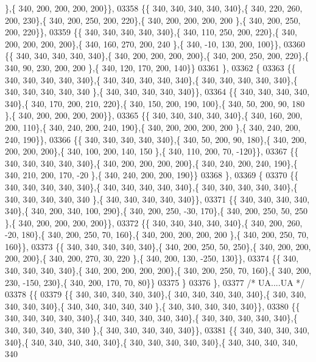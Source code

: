 \begin{DoxyCode}
      \},\{ 340, 200, 200, 200, 200\}\},
03358 \{\{ 340, 340, 340, 340, 340\},\{ 340, 220, 260, 200, 230\},\{ 340, 200, 250, 200, 220\},\{ 340, 200, 200, 200, 200
      \},\{ 340, 200, 250, 200, 220\}\},
03359 \{\{ 340, 340, 340, 340, 340\},\{ 340, 110, 250, 200, 220\},\{ 340, 200, 200, 200, 200\},\{ 340, 160, 270, 200, 240
      \},\{ 340, -10, 130, 200, 100\}\},
03360 \{\{ 340, 340, 340, 340, 340\},\{ 340, 200, 200, 200, 200\},\{ 340, 200, 250, 200, 220\},\{ 340,  90, 230, 200, 200
      \},\{ 340, 120, 170, 200, 140\}\}
03361 \},
03362 \{
03363 \{\{ 340, 340, 340, 340, 340\},\{ 340, 340, 340, 340, 340\},\{ 340, 340, 340, 340, 340\},\{ 340, 340, 340, 340, 340
      \},\{ 340, 340, 340, 340, 340\}\},
03364 \{\{ 340, 340, 340, 340, 340\},\{ 340, 170, 200, 210, 220\},\{ 340, 150, 200, 190, 100\},\{ 340,  50, 200,  90, 180
      \},\{ 340, 200, 200, 200, 200\}\},
03365 \{\{ 340, 340, 340, 340, 340\},\{ 340, 160, 200, 200, 110\},\{ 340, 240, 200, 240, 190\},\{ 340, 200, 200, 200, 200
      \},\{ 340, 240, 200, 240, 190\}\},
03366 \{\{ 340, 340, 340, 340, 340\},\{ 340,  50, 200,  90, 180\},\{ 340, 200, 200, 200, 200\},\{ 340, 100, 200, 140, 150
      \},\{ 340, 110, 200,  70, -120\}\},
03367 \{\{ 340, 340, 340, 340, 340\},\{ 340, 200, 200, 200, 200\},\{ 340, 240, 200, 240, 190\},\{ 340, 210, 200, 170, -20
      \},\{ 340, 240, 200, 200, 190\}\}
03368 \},
03369 \{
03370 \{\{ 340, 340, 340, 340, 340\},\{ 340, 340, 340, 340, 340\},\{ 340, 340, 340, 340, 340\},\{ 340, 340, 340, 340, 340
      \},\{ 340, 340, 340, 340, 340\}\},
03371 \{\{ 340, 340, 340, 340, 340\},\{ 340, 200, 340, 100, 290\},\{ 340, 200, 250, -30, 170\},\{ 340, 200, 250,  50, 250
      \},\{ 340, 200, 200, 200, 200\}\},
03372 \{\{ 340, 340, 340, 340, 340\},\{ 340, 200, 260, -20, 180\},\{ 340, 200, 250,  70, 160\},\{ 340, 200, 200, 200, 200
      \},\{ 340, 200, 250,  70, 160\}\},
03373 \{\{ 340, 340, 340, 340, 340\},\{ 340, 200, 250,  50, 250\},\{ 340, 200, 200, 200, 200\},\{ 340, 200, 270,  30, 220
      \},\{ 340, 200, 130, -250, 130\}\},
03374 \{\{ 340, 340, 340, 340, 340\},\{ 340, 200, 200, 200, 200\},\{ 340, 200, 250,  70, 160\},\{ 340, 200, 230, -150, 
      230\},\{ 340, 200, 170,  70,  80\}\}
03375 \}
03376 \},
03377 \textcolor{comment}{/* UA....UA */}
03378 \{\{
03379 \{\{ 340, 340, 340, 340, 340\},\{ 340, 340, 340, 340, 340\},\{ 340, 340, 340, 340, 340\},\{ 340, 340, 340, 340, 340
      \},\{ 340, 340, 340, 340, 340\}\},
03380 \{\{ 340, 340, 340, 340, 340\},\{ 340, 340, 340, 340, 340\},\{ 340, 340, 340, 340, 340\},\{ 340, 340, 340, 340, 340
      \},\{ 340, 340, 340, 340, 340\}\},
03381 \{\{ 340, 340, 340, 340, 340\},\{ 340, 340, 340, 340, 340\},\{ 340, 340, 340, 340, 340\},\{ 340, 340, 340, 340, 340

\end{DoxyCode}
